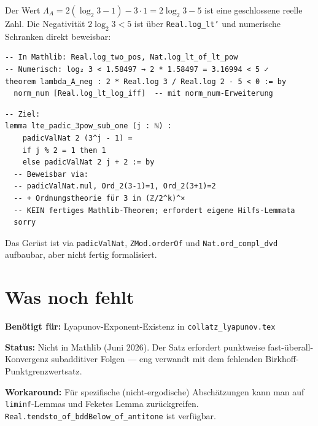 \documentclass[12pt,a4paper]{article}
\newcommand{\vii}{\nu_2}
\begin{document}
\begin{tcolorbox}[vorhanden, title={Beweisbar: $\Lambda_A = 2\log_2 3 - 5 < 0$}]
Der Wert $\Lambda_A = 2(\log_2 3 - 1) - 3 \cdot 1 = 2\log_2 3 - 5$
ist eine geschlossene reelle Zahl. Die Negativität $2\log_2 3 < 5$
ist über \texttt{Real.log\_lt'} und numerische Schranken direkt beweisbar:
\begin{lstlisting}[language=Lean4]
-- In Mathlib: Real.log_two_pos, Nat.log_lt_of_lt_pow
-- Numerisch: log₂ 3 < 1.58497 → 2 * 1.58497 = 3.16994 < 5 ✓
theorem lambda_A_neg : 2 * Real.log 3 / Real.log 2 - 5 < 0 := by
  norm_num [Real.log_lt_log_iff]  -- mit norm_num-Erweiterung
\end{lstlisting}
\end{tcolorbox}

\begin{tcolorbox}[teilweise, title={Teilweise beweisbar: LTE-Valuation $\vii(3^j-1)$}]
\begin{lstlisting}[language=Lean4]
-- Ziel:
lemma lte_padic_3pow_sub_one (j : ℕ) :
    padicValNat 2 (3^j - 1) =
    if j % 2 = 1 then 1
    else padicValNat 2 j + 2 := by
  -- Beweisbar via:
  -- padicValNat.mul, Ord_2(3-1)=1, Ord_2(3+1)=2
  -- + Ordnungstheorie für 3 in (ℤ/2^k)^×
  -- KEIN fertiges Mathlib-Theorem; erfordert eigene Hilfs-Lemmata
  sorry
\end{lstlisting}
Das Gerüst ist via \texttt{padicValNat}, \texttt{ZMod.orderOf} und
\texttt{Nat.ord\_compl\_dvd} aufbaubar, aber nicht fertig formalisiert.
\end{tcolorbox}

\section{Was noch fehlt}
\label{sec:luecken}

\begin{tcolorbox}[lücke, title={Fehlt: Kingman-Subadditivitätssatz}]
\textbf{Benötigt für:} Lyapunov-Exponent-Existenz in \texttt{collatz\_lyapunov.tex}

\textbf{Status:} Nicht in Mathlib (Juni 2026). Der Satz erfordert
punktweise fast-überall-Konvergenz subadditiver Folgen --- eng verwandt
mit dem fehlenden Birkhoff-Punktgrenzwertsatz.

\textbf{Workaround:} Für spezifische (nicht-ergodische) Abschätzungen
kann man auf \texttt{liminf}-Lemmas und Feketes Lemma zurückgreifen.
\texttt{Real.tendsto\_of\_bddBelow\_of\_antitone} ist verfügbar.
\end{tcolorbox}
\end{document}
